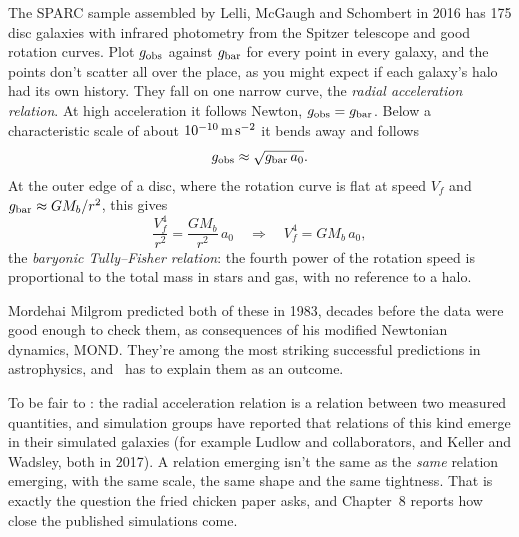 The SPARC sample assembled by Lelli, McGaugh and Schombert in 2016 has 175 disc galaxies with infrared photometry from the Spitzer telescope and good rotation curves. Plot $g_{\rm obs}$ against $g_{\rm bar}$ for every point in every galaxy, and the points don't scatter all over the place, as you might expect if each galaxy's halo had its own history. They fall on one narrow curve, the \emph{radial acceleration relation}. At high acceleration it follows Newton, $g_{\rm obs}=g_{\rm bar}$. Below a characteristic scale of about $10^{-10}\,\mathrm{m\,s^{-2}}$ it bends away and follows
\begin{equation}
g_{\rm obs}\approx\sqrt{g_{\rm bar}\,a_0}.
\end{equation}
At the outer edge of a disc, where the rotation curve is flat at speed $V_f$ and $g_{\rm bar}\approx GM_b/r^2$, this gives
\begin{equation}
\frac{V_f^4}{r^2}=\frac{GM_b}{r^2}\,a_0\quad\Longrightarrow\quad V_f^4=GM_b\,a_0,
\end{equation}
the \emph{baryonic Tully--Fisher relation}: the fourth power of the rotation speed is proportional to the total mass in stars and gas, with no reference to a halo.





Mordehai Milgrom predicted both of these in 1983, decades before the data were good enough to check them, as consequences of his modified Newtonian dynamics, MOND. They're among the most striking successful predictions in astrophysics, and \LCDM\ has to explain them as an outcome.

\begin{honestbox}
To be fair to \LCDM: the radial acceleration relation is a relation between two measured quantities, and simulation groups have reported that relations of this kind emerge in their simulated galaxies (for example Ludlow and collaborators, and Keller and Wadsley, both in 2017). A relation emerging isn't the same as the \emph{same} relation emerging, with the same scale, the same shape and the same tightness. That is exactly the question the fried chicken paper asks, and Chapter~8 reports how close the published simulations come.
\end{honestbox}

